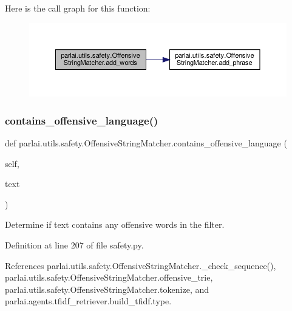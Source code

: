 Here is the call graph for this function\+:
\nopagebreak
\begin{figure}[H]
\begin{center}
\leavevmode
\includegraphics[width=350pt]{classparlai_1_1utils_1_1safety_1_1OffensiveStringMatcher_ab5ca96a02141190f747b03b761f18f98_cgraph}
\end{center}
\end{figure}
\mbox{\label{classparlai_1_1utils_1_1safety_1_1OffensiveStringMatcher_a926609d00716d64848b3b98079bd1d30}} 
\subsubsection{\texorpdfstring{contains\+\_\+offensive\+\_\+language()}{contains\_offensive\_language()}}
{\footnotesize\ttfamily def parlai.\+utils.\+safety.\+Offensive\+String\+Matcher.\+contains\+\_\+offensive\+\_\+language (\begin{DoxyParamCaption}\item[{}]{self,  }\item[{}]{text }\end{DoxyParamCaption})}

\begin{DoxyVerb}Determine if text contains any offensive words in the filter.\end{DoxyVerb}
 

Definition at line 207 of file safety.\+py.



References parlai.\+utils.\+safety.\+Offensive\+String\+Matcher.\+\_\+check\+\_\+sequence(), parlai.\+utils.\+safety.\+Offensive\+String\+Matcher.\+offensive\+\_\+trie, parlai.\+utils.\+safety.\+Offensive\+String\+Matcher.\+tokenize, and parlai.\+agents.\+tfidf\+\_\+retriever.\+build\+\_\+tfidf.\+type.



